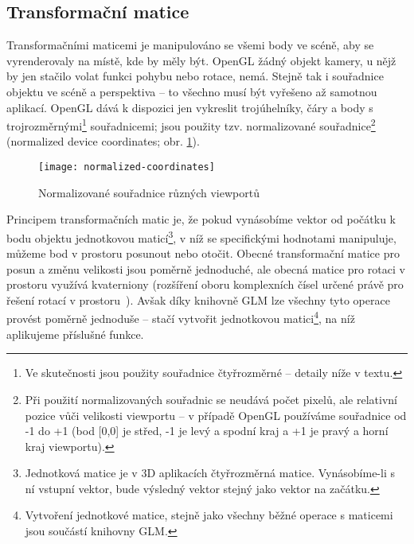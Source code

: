 \documentclass[a4paper, 11pt]{report}
\begin{document}
\subsection{Transformační matice}
Transformačními maticemi je manipulováno se všemi body ve scéně, aby se vyrenderovaly na místě, kde by měly být. OpenGL žádný objekt kamery, u nějž by jen stačilo volat funkci pohybu nebo rotace, nemá. Stejně tak i souřadnice objektu ve scéně a perspektiva -- to všechno musí být vyřešeno až samotnou aplikací. OpenGL dává k dispozici jen vykreslit trojúhelníky, čáry a body s trojrozměrnými\footnote{Ve skutečnosti jsou použity souřadnice čtyřrozměrné -- detaily níže v textu.} souřadnicemi; jsou použity tzv. normalizované souřadnice\footnote{Při použití normalizovaných souřadnic se neudává počet pixelů, ale relativní pozice vůči velikosti viewportu -- v případě OpenGL používáme souřadnice od -1 do +1 (bod [0,0] je střed, -1 je levý a spodní kraj a +1 je pravý a horní kraj viewportu).} (normalized device coordinates; obr. \ref{normalized}). 

\begin{figure}[h]
	\centering
    \texttt{[image: normalized-coordinates]}
    \caption[Normalizované souřadnice]{\label{normalized}Normalizované souřadnice různých viewportů~\cite{pic:normalized-coordinates}}
\end{figure}

Principem transformačních matic je, že pokud vynásobíme vektor od počátku k bodu objektu jednotkovou maticí\footnote{Jednotková matice je v 3D aplikacích čtyřrozměrná matice. Vynásobíme-li s ní vstupní vektor, bude výsledný vektor stejný jako vektor na začátku.}, v níž se specifickými hodnotami manipuluje, můžeme bod v prostoru posunout nebo otočit. Obecné transformační matice pro posun a změnu velikosti jsou poměrně jednoduché, ale obecná matice pro rotaci v prostoru využívá kvaterniony (rozšíření oboru komplexních čísel určené právě pro řešení rotací v prostoru~\cite{wiki:kvaterniony}). Avšak díky knihovně GLM lze všechny tyto operace provést poměrně jednoduše -- stačí vytvořit jednotkovou matici\footnote{Vytvoření jednotkové matice, stejně jako všechny běžné operace s maticemi jsou součástí knihovny GLM.}, na níž aplikujeme příslušné funkce.
\end{document}

